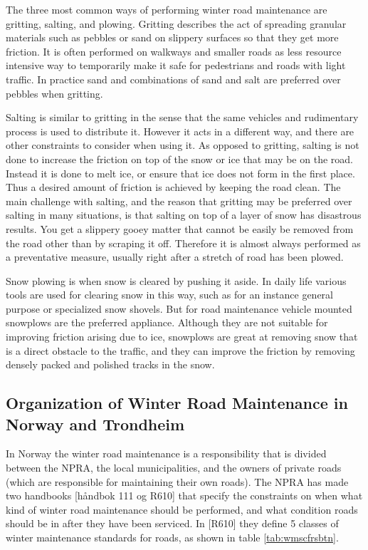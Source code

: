 The three most common ways of performing winter road maintenance are gritting, salting, and plowing. Gritting describes the act of spreading granular materials such as pebbles or sand on slippery surfaces so that they get more friction. It is often performed on walkways and smaller roads as less resource intensive way to temporarily make it safe for pedestrians and roads with light traffic. In practice sand and combinations of sand and salt are preferred over pebbles when gritting.

Salting is similar to gritting in the sense that the same vehicles and rudimentary process is used to distribute it. However it acts in a different way, and there are other constraints to consider when using it. As opposed to gritting, salting is not done to increase the friction on top of the snow or ice that may be on the road. Instead it is done to melt ice, or ensure that ice does not form in the first place. Thus a desired amount of friction is achieved by keeping the road clean. The main challenge with salting, and the reason that gritting may be preferred over salting in many situations, is that salting on top of a layer of snow has disastrous results. You get a slippery gooey matter that cannot be easily be removed from the road other than by scraping it off. Therefore it is almost always performed as a preventative measure, usually right after a stretch of road has been plowed.

Snow plowing is when snow is cleared by pushing it aside. In daily life various tools are used for clearing snow in this way, such as for an instance general purpose or specialized snow shovels. But for road maintenance vehicle mounted snowplows are the preferred appliance. Although they are not suitable for improving friction arising due to ice, snowplows are great at removing snow that is a direct obstacle to the traffic, and they can improve the friction  by removing densely packed and polished tracks in the snow.

\subsection{Organization of Winter Road Maintenance in Norway and Trondheim} %
\label{ssub:how_winter_road_maintenance_is_organized_in_norway_and_trondheim}


In Norway the winter road maintenance is a responsibility that is divided between the NPRA, the local municipalities, and the owners of private roads (which are responsible for maintaining their own roads). The NPRA has made two handbooks [håndbok 111 og R610] that specify the constraints on when what kind of winter road maintenance should be performed, and what condition roads should be in after they have been serviced. In [R610] they define 5 classes of winter maintenance standards for roads, as shown in table \ref{tab:wmscfrsbtn}.

